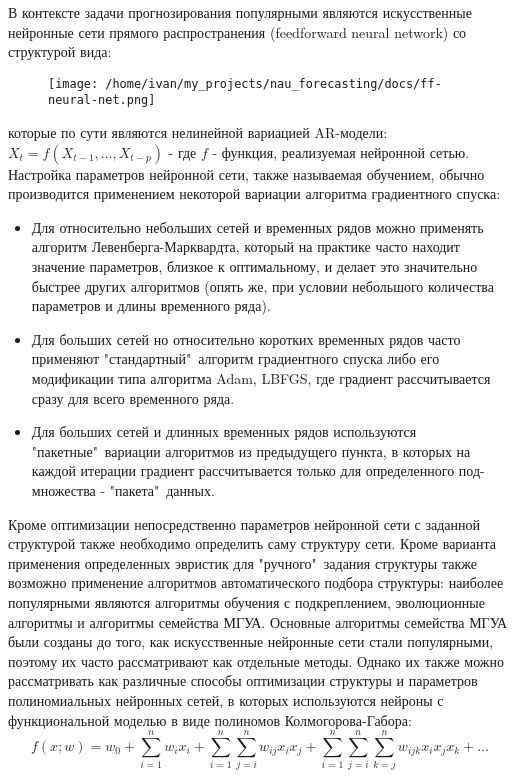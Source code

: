 \documentclass[11pt]{article}
\begin{document}
В контексте задачи прогнозирования популярными являются искусственные нейронные сети прямого распространения (feedforward neural network) со структурой вида:
\begin{figure}[H]
\centering
\texttt{[image: /home/ivan/my\_projects/nau\_forecasting/docs/ff-neural-net.png]}
\label{}
\end{figure}
которые по сути являются нелинейной вариацией AR-модели: $X_t = f(X_{t-1},...,X_{t-p})$ - где $f$ - функция, реализуемая нейронной сетью.
Настройка параметров нейронной сети, также называемая обучением, обычно производится применением некоторой вариации алгоритма градиентного спуска:
\begin{itemize}
\item Для относительно небольших сетей и временных рядов можно применять алгоритм Левенберга-Марквардта, который на практике часто находит значение параметров, близкое к оптимальному, и делает это значительно быстрее других алгоритмов (опять же, при условии небольшого количества параметров и длины временного ряда). 
\item Для больших сетей но относительно коротких временных рядов часто применяют "стандартный"\ алгоритм градиентного спуска либо его модификации типа алгоритма Adam, LBFGS, где градиент рассчитывается сразу для всего временного ряда.
\item Для больших сетей и длинных временных рядов используются "пакетные"\ вариации алгоритмов из предыдущего пункта, в которых на каждой итерации градиент рассчитывается только для определенного под-множества - "пакета"\ данных.
\end{itemize}
Кроме оптимизации непосредственно параметров нейронной сети с заданной структурой также необходимо определить саму структуру сети. Кроме варианта применения определенных эвристик для "ручного"\ задания структуры также возможно применение алгоритмов автоматического подбора структуры: наиболее популярными являются алгоритмы обучения с подкреплением, эволюционные алгоритмы и алгоритмы семейства МГУА. Основные алгоритмы семейства МГУА были созданы до того, как искусственные нейронные сети стали популярными, поэтому их часто рассматривают как отдельные методы. Однако их также можно рассматривать как различные способы оптимизации структуры и параметров полиномиальных нейронных сетей, в которых используются нейроны с функциональной моделью в виде полиномов Колмогорова-Габора:
$$ f(x;w) = w_0 + \sum_{i=1}^{n}{w_ix_i} + \sum_{i=1}^{n}{\sum_{j=i}^{n}{w_{ij}x_ix_j}} + \sum_{i=1}^{n}{\sum_{j=i}^{n}{\sum_{k=j}^{n}{w_{ijk}x_ix_jx_k}}} + ... $$
\end{document}
